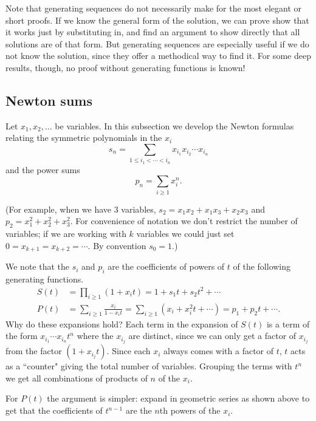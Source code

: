 Note that generating sequences do not necessarily make for the most elegant or short proofs. If we know the general form of the solution, we can prove show that it works just by substituting in, and find an argument to show directly that all solutions are of that form. But generating sequences are especially useful if we do not know the solution, since they offer a methodical way to find it. For some deep results, though, no proof without generating functions is known!
\subsection{Newton sums}
Let $ x_1,x_2,\ldots$ be variables. In this subsection we develop the Newton formulas relating the symmetric polynomials in the $ x_i$
\[s_n=\sum_{1\leq i_1<\cdots <i_n}x_{i_1}x_{i_2}\cdots x_{i_n}\]
and the power sums
\[p_n=\sum_{i\geq 1} x_i^n.\]

(For example, when we have 3 variables, $ s_2=x_1x_2+x_1x_3+x_2x_3$ and $ p_2=x_1^2+x_2^2+x_3^2$. For convenience of notation we don't restrict the number of variables; if we are working with $ k$ variables we could just set $ 0=x_{k+1}=x_{k+2}=\cdots $. By convention $ s_0=1$.)

We note that the $s_i$ and $p_i$ are the coefficients of powers of $ t$ of the following generating functions.
\begin{align*} S(t)&=\prod_{i\geq 1} (1+x_it)=1+s_1t+s_2t^2+\cdots\\
P(t)&=\sum_{i\geq 1}\frac{x_i}{1-x_it}=\sum_{i\geq 1} (x_i+x_i^2t+\cdots)=p_1+p_2t+\cdots.
\end{align*}
Why do these expansions hold? Each term in the expansion of $ S(t)$ is a term of the form $ x_{i_1}\cdots x_{i_n}t^n$ where the $ x_{i_j}$ are distinct, since we can only get a factor of $ x_{i_j}$ from the factor $ (1+x_{i_j}t)$. Since each $ x_i$ always comes with a factor of $ t$, $ t$ acts as a ``counter" giving the total number of variables. Grouping the terms with $ t^n$ we get all combinations of products of $ n$ of the $ x_i$.

For $ P(t)$ the argument is simpler: expand in geometric series as shown above to get that the coefficients of $ t^{n-1}$ are the $ n$th powers of the $ x_i$.


